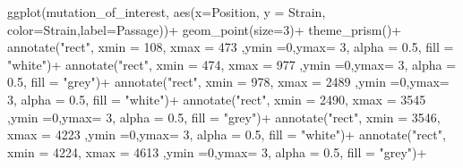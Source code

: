 \documentclass[
]{article}
\newenvironment{Shaded}{\begin{snugshade}}{\end{snugshade}}
\newcommand{\AttributeTok}[1]{\textcolor[rgb]{0.77,0.63,0.00}{#1}}
\newcommand{\DecValTok}[1]{\textcolor[rgb]{0.00,0.00,0.81}{#1}}
\newcommand{\FloatTok}[1]{\textcolor[rgb]{0.00,0.00,0.81}{#1}}
\newcommand{\FunctionTok}[1]{\textcolor[rgb]{0.00,0.00,0.00}{#1}}
\newcommand{\NormalTok}[1]{#1}
\newcommand{\SpecialCharTok}[1]{\textcolor[rgb]{0.00,0.00,0.00}{#1}}
\newcommand{\StringTok}[1]{\textcolor[rgb]{0.31,0.60,0.02}{#1}}
\begin{document}
\begin{Shaded}
\begin{Highlighting}[]
\FunctionTok{ggplot}\NormalTok{(mutation\_of\_interest, }\FunctionTok{aes}\NormalTok{(}\AttributeTok{x=}\NormalTok{Position, }\AttributeTok{y =}\NormalTok{ Strain, }\AttributeTok{color=}\NormalTok{Strain,}\AttributeTok{label=}\NormalTok{Passage))}\SpecialCharTok{+}
  \FunctionTok{geom\_point}\NormalTok{(}\AttributeTok{size=}\DecValTok{3}\NormalTok{)}\SpecialCharTok{+}
  \FunctionTok{theme\_prism}\NormalTok{()}\SpecialCharTok{+}
  \FunctionTok{annotate}\NormalTok{(}\StringTok{"rect"}\NormalTok{, }\AttributeTok{xmin =} \DecValTok{108}\NormalTok{, }\AttributeTok{xmax =} \DecValTok{473}\NormalTok{ ,}\AttributeTok{ymin =}\DecValTok{0}\NormalTok{,}\AttributeTok{ymax=} \DecValTok{3}\NormalTok{, }\AttributeTok{alpha =} \FloatTok{0.5}\NormalTok{, }\AttributeTok{fill =} \StringTok{"white"}\NormalTok{)}\SpecialCharTok{+}
  \FunctionTok{annotate}\NormalTok{(}\StringTok{"rect"}\NormalTok{, }\AttributeTok{xmin =} \DecValTok{474}\NormalTok{, }\AttributeTok{xmax =} \DecValTok{977}\NormalTok{ ,}\AttributeTok{ymin =}\DecValTok{0}\NormalTok{,}\AttributeTok{ymax=} \DecValTok{3}\NormalTok{, }\AttributeTok{alpha =} \FloatTok{0.5}\NormalTok{, }\AttributeTok{fill =} \StringTok{"grey"}\NormalTok{)}\SpecialCharTok{+}
  \FunctionTok{annotate}\NormalTok{(}\StringTok{"rect"}\NormalTok{, }\AttributeTok{xmin =} \DecValTok{978}\NormalTok{, }\AttributeTok{xmax =} \DecValTok{2489}\NormalTok{ ,}\AttributeTok{ymin =}\DecValTok{0}\NormalTok{,}\AttributeTok{ymax=} \DecValTok{3}\NormalTok{, }\AttributeTok{alpha =} \FloatTok{0.5}\NormalTok{, }\AttributeTok{fill =} \StringTok{"white"}\NormalTok{)}\SpecialCharTok{+}
  \FunctionTok{annotate}\NormalTok{(}\StringTok{"rect"}\NormalTok{, }\AttributeTok{xmin =} \DecValTok{2490}\NormalTok{, }\AttributeTok{xmax =} \DecValTok{3545}\NormalTok{ ,}\AttributeTok{ymin =}\DecValTok{0}\NormalTok{,}\AttributeTok{ymax=} \DecValTok{3}\NormalTok{, }\AttributeTok{alpha =} \FloatTok{0.5}\NormalTok{, }\AttributeTok{fill =} \StringTok{"grey"}\NormalTok{)}\SpecialCharTok{+}
  \FunctionTok{annotate}\NormalTok{(}\StringTok{"rect"}\NormalTok{, }\AttributeTok{xmin =} \DecValTok{3546}\NormalTok{, }\AttributeTok{xmax =} \DecValTok{4223}\NormalTok{ ,}\AttributeTok{ymin =}\DecValTok{0}\NormalTok{,}\AttributeTok{ymax=} \DecValTok{3}\NormalTok{, }\AttributeTok{alpha =} \FloatTok{0.5}\NormalTok{, }\AttributeTok{fill =} \StringTok{"white"}\NormalTok{)}\SpecialCharTok{+}
  \FunctionTok{annotate}\NormalTok{(}\StringTok{"rect"}\NormalTok{, }\AttributeTok{xmin =} \DecValTok{4224}\NormalTok{, }\AttributeTok{xmax =} \DecValTok{4613}\NormalTok{ ,}\AttributeTok{ymin =}\DecValTok{0}\NormalTok{,}\AttributeTok{ymax=} \DecValTok{3}\NormalTok{, }\AttributeTok{alpha =} \FloatTok{0.5}\NormalTok{, }\AttributeTok{fill =} \StringTok{"grey"}\NormalTok{)}\SpecialCharTok{+}

\end{Highlighting}
\end{Shaded}
\end{document}
